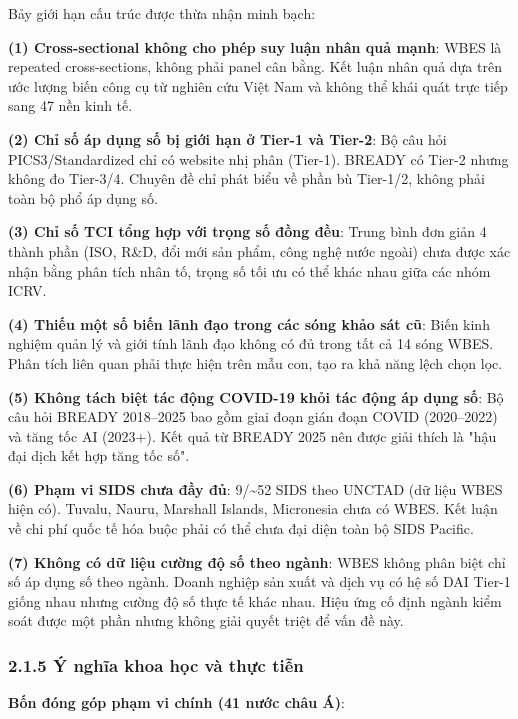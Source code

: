 \documentclass[12pt,a4paper]{article}
\begin{document}
Bảy giới hạn cấu trúc được thừa nhận minh bạch:

\textbf{(1) Cross-sectional không cho phép suy luận nhân quả mạnh}: WBES
là repeated cross-sections, không phải panel cân bằng. Kết luận nhân quả
dựa trên ước lượng biến công cụ từ nghiên cứu Việt Nam và không thể khái
quát trực tiếp sang 47 nền kinh tế.

\textbf{(2) Chỉ số áp dụng số bị giới hạn ở Tier-1 và Tier-2}: Bộ câu
hỏi PICS3/Standardized chỉ có website nhị phân (Tier-1). BREADY có
Tier-2 nhưng không đo Tier-3/4. Chuyên đề chỉ phát biểu về phần bù
Tier-1/2, không phải toàn bộ phổ áp dụng số.

\textbf{(3) Chỉ số TCI tổng hợp với trọng số đồng đều}: Trung bình đơn
giản 4 thành phần (ISO, R\&D, đổi mới sản phẩm, công nghệ nước ngoài)
chưa được xác nhận bằng phân tích nhân tố, trọng số tối ưu có thể khác
nhau giữa các nhóm ICRV.

\textbf{(4) Thiếu một số biến lãnh đạo trong các sóng khảo sát cũ}: Biến
kinh nghiệm quản lý và giới tính lãnh đạo không có đủ trong tất cả 14
sóng WBES. Phân tích liên quan phải thực hiện trên mẫu con, tạo ra khả
năng lệch chọn lọc.

\textbf{(5) Không tách biệt tác động COVID-19 khỏi tác động áp dụng số}:
Bộ câu hỏi BREADY 2018--2025 bao gồm giai đoạn gián đoạn COVID
(2020--2022) và tăng tốc AI (2023+). Kết quả từ BREADY 2025 nên được
giải thích là "hậu đại dịch kết hợp tăng tốc số".

\textbf{(6) Phạm vi SIDS chưa đầy đủ}: 9/\textasciitilde52 SIDS theo
UNCTAD (dữ liệu WBES hiện có). Tuvalu, Nauru, Marshall Islands,
Micronesia chưa có WBES. Kết luận về chi phí quốc tế hóa buộc phải có
thể chưa đại diện toàn bộ SIDS Pacific.

\textbf{(7) Không có dữ liệu cường độ số theo ngành}: WBES không phân
biệt chỉ số áp dụng số theo ngành. Doanh nghiệp sản xuất và dịch vụ có
hệ số DAI Tier-1 giống nhau nhưng cường độ số thực tế khác nhau. Hiệu
ứng cố định ngành kiểm soát được một phần nhưng không giải quyết triệt
để vấn đề này.

\hypertarget{215-uxfd-nghux129a-khoa-hux1ecdc-vuxe0-thux1ef1c-tiux1ec5n}{%
\subsubsection{2.1.5 Ý nghĩa khoa học và thực
tiễn}\label{215-uxfd-nghux129a-khoa-hux1ecdc-vuxe0-thux1ef1c-tiux1ec5n}}

\textbf{Bốn đóng góp phạm vi chính (41 nước châu Á)}:
\end{document}
